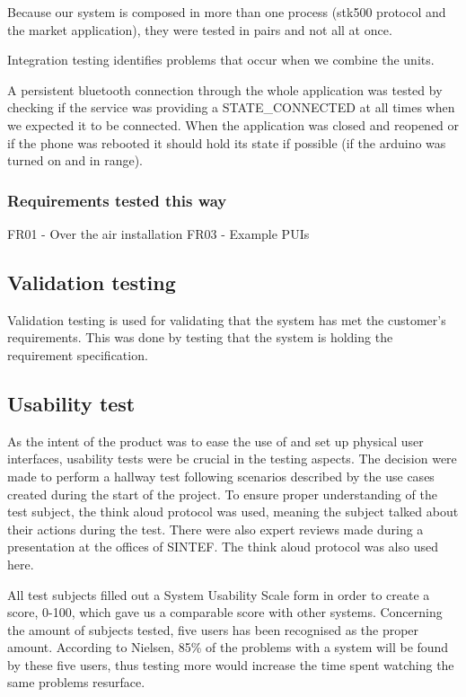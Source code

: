 			Because our system is composed in more than one process (stk500 protocol and the market application), they
			were tested in pairs and not all at once.

			Integration testing identifies problems that occur when we combine the units.

			A persistent bluetooth connection through the whole application was tested by checking if the service was providing a STATE\_CONNECTED at all times when we expected it to be connected. When the application was closed and reopened or if the phone was rebooted it should hold its state if possible (if the arduino was turned on and in range). 

			\subsubsection{Requirements tested this way}
			FR01 - Over the air installation
			FR03 - Example PUIs

		\subsection{Validation testing}
			Validation testing is used for validating that the system has met the customer's requirements. This was done by testing that the system is holding the requirement specification.


		\subsection{Usability test}
		As the intent of the product was to ease the use of and set up physical user interfaces, usability tests were be crucial in the testing aspects. The decision were made to perform a hallway test following scenarios described by the use cases created during the start of the project. To ensure proper understanding of the test subject, the think aloud protocol was used, meaning the subject talked about their actions during the test. There were also expert reviews made during a presentation at the offices of SINTEF. The think aloud protocol was also used here.

		All test subjects filled out a System Usability Scale form in order to create a score, 0-100, which gave us a comparable score with other systems. Concerning the amount of subjects tested, five users has been recognised as the proper amount. According to Nielsen, 85\% of the problems with a system will be found by these five users, thus testing more would increase the time spent watching the same problems resurface.

